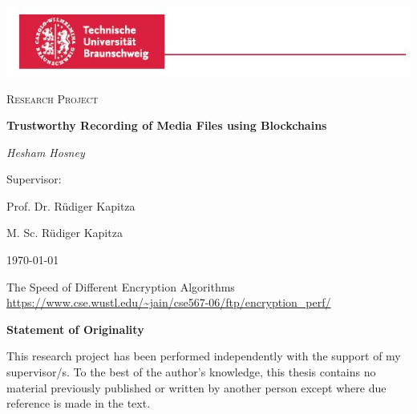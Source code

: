 \documentclass{report}
\begin{document}
\begin{titlepage}
	\centering
	\includegraphics[width=\paperwidth]{images/logo.jpg}\par\vspace{1cm}
	{\scshape\LARGE  \par}
	\vspace{1cm}
	{\scshape\Large Research Project\par}
	\vspace{1.5cm}
	{\huge\bfseries Trustworthy Recording of Media Files using Blockchains \par}
	\vspace{1cm}
	{\huge\itshape Hesham Hosney\par}
        \vspace{2cm} 
	{\Large Supervisor:\par } 
	{\huge Prof. Dr. Rüdiger Kapitza\par}
        \vspace{.5cm} 
        {\huge M. Sc. Rüdiger Kapitza}
	\vfill
	{\large \today\par}
\end{titlepage}


\cleardoublepage

\tableofcontents
\cleardoublepage





\cleardoublepage
\listoffigures
\begin{thebibliography}{9}

The Speed of Different Encryption Algorithms
\url{https://www.cse.wustl.edu/~jain/cse567-06/ftp/encryption_perf/}

\centerline{\bfseries Statement of Originality}
	\vspace*{1em}
	\noindent
	This research project has been performed independently with the support of my supervisor/s.
	To the best of the author's knowledge, this thesis contains no material previously
	published or written by another person except where due reference is made in the text.

\appendix

\end{thebibliography}
\end{document}
